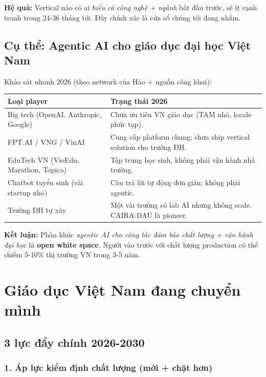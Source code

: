 \documentclass[11pt,a4paper]{article}
\begin{document}
\textbf{Hệ quả:} Vertical nào có ai \textit{hiểu cả công nghệ + ngành} bắt đầu trước, sẽ ít cạnh tranh trong 24-36 tháng tới. Đây chính xác là cửa sổ chúng tôi đang nhắm.

\subsection{Cụ thể: Agentic AI cho giáo dục đại học Việt Nam}

Khảo sát nhanh 2026 (theo network của Hảo + nguồn công khai):

\begin{tabularx}{\linewidth}{@{}p{4.5cm} X@{}}
\toprule
\textbf{Loại player} & \textbf{Trạng thái 2026} \\
\midrule
Big tech (OpenAI, Anthropic, Google) & Chưa ưu tiên VN giáo dục (TAM nhỏ, locale phức tạp). \\
FPT.AI / VNG / VinAI & Cung cấp platform chung; chưa ship vertical solution cho trường ĐH. \\
EduTech VN (VioEdu, Marathon, Topica) & Tập trung học sinh, không phải vận hành nhà trường. \\
Chatbot tuyển sinh (vài startup nhỏ) & Câu trả lời tự động đơn giản; không phải agentic. \\
Trường ĐH tự xây & Một vài trường có lab AI nhưng không scale. CAIRA-DAU là pioneer. \\
\bottomrule
\end{tabularx}

\textbf{Kết luận:} Phân khúc \textit{agentic AI cho công tác đảm bảo chất lượng + vận hành đại học} là \textbf{open white space}. Người vào trước với chất lượng production có thể chiếm 5-10\% thị trường VN trong 3-5 năm.

\clearpage

\section{Giáo dục Việt Nam đang chuyển mình}

\subsection{3 lực đẩy chính 2026-2030}

\subsubsection*{1. Áp lực kiểm định chất lượng (mới + chặt hơn)}
\end{document}
